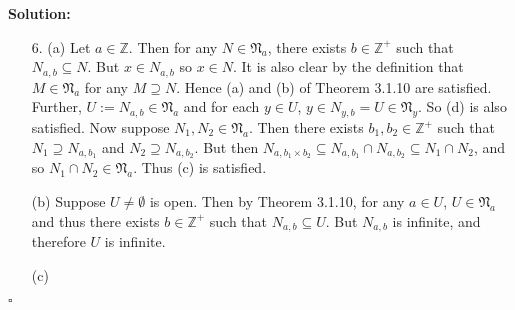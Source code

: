\documentclass[12pt]{article}
\newcounter{ProofCounter}
\newenvironment{Solution}{\stepcounter{ProofCounter}\textbf{Solution:}}{\hfill$\square$}
\begin{document}
\begin{Solution}
\begin{enumerate}
    \item[6.] (a) Let $a \in \mathbb{Z}$. Then for any $N \in \mathfrak{N}_a$, there exists $b \in \mathbb{Z^+}$ such that $N_{a,b} \subseteq N$. But $x
      \in N_{a,b}$ so $x \in N$. It is also clear by the definition that $M \in \mathfrak{N}_{a}$ for any $M \supseteq N$. Hence (a) and (b) of
      Theorem 3.1.10 are satisfied. Further, $U := N_{a,b} \in \mathfrak{N}_a$ and for each $y \in U$, $y \in N_{y,b} = U \in \mathfrak{N}_{y}$. So
      (d) is also satisfied.
      Now suppose $N_1, N_2 \in \mathfrak{N}_a$. Then there exists $b_1, b_2 \in \mathbb{Z^+}$ such that $N_1 \supseteq N_{a,b_1}$ and $N_2\supseteq
      N_{a,b_2}$. But then $N_{a,b_1\times b_2} \subseteq N_{a,b_1}\cap N_{a,b_2} \subseteq N_1\cap N_2$, and so $N_1\cap N_2 \in \mathfrak{N}_a$.
      Thus (c) is satisfied.

      (b) Suppose $U \neq \emptyset$ is open. Then by Theorem 3.1.10, for any $a \in U$, $U \in \mathfrak{N}_{a}$ and thus there exists $b \in
      \mathbb{Z}^+$ such that
      $N_{a,b} \subseteq U$. But $N_{a,b}$ is infinite, and therefore $U$ is infinite.

      (c)
  \end{enumerate}
\end{Solution}
\end{document}

